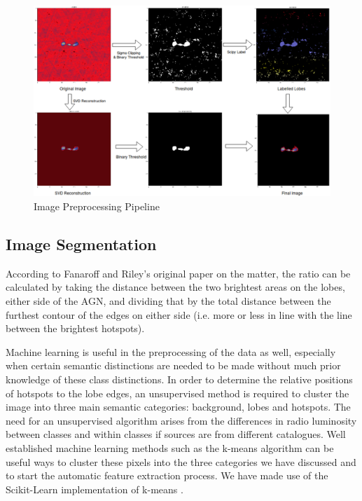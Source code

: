 \documentclass[conference]{IEEEtran}
\begin{document}
\begin{figure}[h]
    \centering
    \includegraphics[scale=0.5]{EPS/pipelines.eps}
    \caption{Image Preprocessing Pipeline}
    \label{fig:imagepipeline}
\end{figure}

\subsection{Image Segmentation}
According to Fanaroff and Riley's original paper on the matter, the ratio can be calculated by taking the distance between the two brightest areas on the lobes, either side of the AGN, and dividing that by the total distance between the furthest contour of the edges on either side (i.e. more or less in line with the line between the brightest hotspots).

Machine learning is useful in the preprocessing of the data as well, especially when certain semantic distinctions are needed to be made without much prior knowledge of these class distinctions. In order to determine the relative positions of hotspots to the lobe edges, an unsupervised method is required to cluster the image into three main semantic categories: background, lobes and hotspots. The need for an unsupervised algorithm arises from the differences in radio luminosity between classes and within classes if sources are from different catalogues.
Well established machine learning methods such as the k-means 
algorithm \cite{macqueen1967} can be useful ways to 
cluster these pixels into the three categories we have discussed and to start the automatic feature extraction process. We have made use of the Scikit-Learn implementation of k-means \cite{scikit-learn}. 
\end{document}
